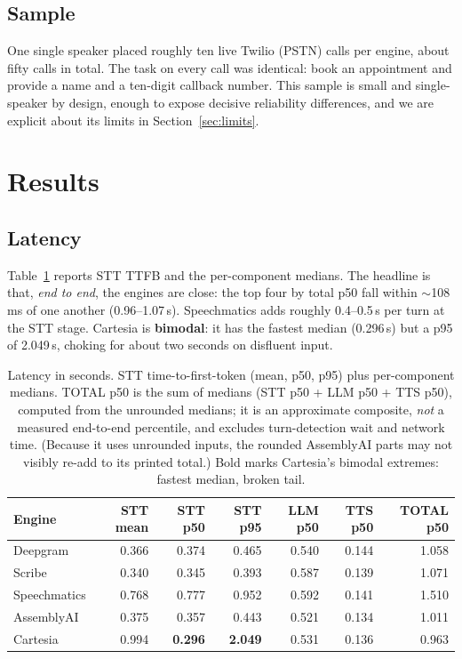 \documentclass[11pt]{article}
\begin{document}
\subsection{Sample}
One single speaker placed roughly ten live Twilio (PSTN) calls per engine, about
fifty calls in total. The task on every call was identical: book an appointment
and provide a name and a ten-digit callback number. This sample is small and
single-speaker by design, enough to expose decisive reliability differences,
and we are explicit about its limits in Section~\ref{sec:limits}.

\section{Results}
\label{sec:results}

\subsection{Latency}
\label{sec:lat}

Table~\ref{tab:latency} reports STT TTFB and the per-component medians.
The headline is that, \emph{end to end}, the engines are close: the top four by
total p50 fall within $\sim$108\,ms of one another (0.96--1.07\,s).
Speechmatics adds roughly 0.4--0.5\,s per turn at the STT stage. Cartesia is
\textbf{bimodal}: it has the fastest median (0.296\,s) but a p95 of 2.049\,s,
choking for about two seconds on disfluent input.

\begin{table}[ht]
\centering
\small
\begin{tabular}{@{}lrrrrrr@{}}
\toprule
\textbf{Engine} & \textbf{STT mean} & \textbf{STT p50} & \textbf{STT p95}
                & \textbf{LLM p50} & \textbf{TTS p50} & \textbf{TOTAL p50} \\
\midrule
Deepgram & 0.366 & 0.374 & 0.465 & 0.540 & 0.144 & 1.058 \\
Scribe & 0.340 & 0.345 & 0.393 & 0.587 & 0.139 & 1.071 \\
Speechmatics & 0.768 & 0.777 & 0.952 & 0.592 & 0.141 & 1.510 \\
AssemblyAI & 0.375 & 0.357 & 0.443 & 0.521 & 0.134 & 1.011 \\
Cartesia & 0.994 & \textbf{0.296} & \textbf{2.049} & 0.531 & 0.136 & 0.963 \\
\bottomrule
\end{tabular}
\caption{Latency in seconds. STT time-to-first-token (mean, p50, p95) plus
per-component medians. TOTAL p50 is the sum of medians (STT p50 + LLM p50 +
TTS p50), computed from the unrounded medians; it is an approximate composite,
\emph{not} a measured end-to-end percentile, and excludes turn-detection wait
and network time. (Because it uses unrounded inputs, the rounded AssemblyAI
parts may not visibly re-add to its printed total.) Bold marks Cartesia's
bimodal extremes: fastest median, broken tail.}
\label{tab:latency}
\end{table}
\end{document}
